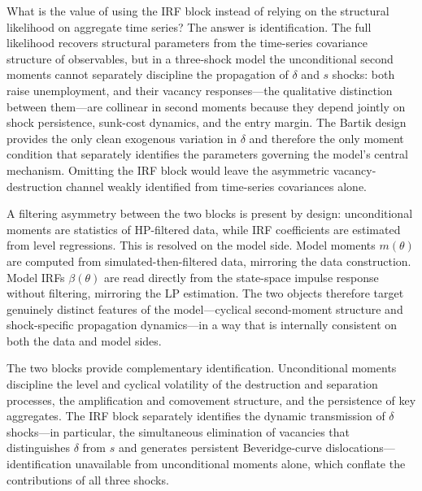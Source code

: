 \documentclass[authoryear, review, 12pt]{elsarticle}
\begin{document}
	What is the value of using the IRF block instead of relying on the structural likelihood on aggregate time series? The answer is identification.  The full likelihood recovers structural
	parameters from the time-series covariance structure of observables, but in a
	three-shock model the unconditional second moments cannot separately discipline the
	propagation of $\delta$ and $s$ shocks: both raise unemployment, and their
	vacancy responses---the qualitative distinction between them---are collinear in
	second moments because they depend jointly on shock persistence, sunk-cost
	dynamics, and the entry margin.  The Bartik design provides the only clean
	exogenous variation in $\delta$ and therefore the only moment condition that
	separately identifies the parameters governing the model's central mechanism.
	Omitting the IRF block would leave the asymmetric vacancy-destruction channel
	weakly identified from time-series covariances alone.

	A filtering asymmetry between the two blocks is present by design: unconditional
	moments are statistics of HP-filtered data, while IRF coefficients are estimated
	from level regressions. This is resolved on the model side. Model moments
	$m(\theta)$ are computed from simulated-then-filtered data, mirroring the data
	construction. Model IRFs $\beta(\theta)$ are read directly from the state-space
	impulse response without filtering, mirroring the LP estimation. The two objects
	therefore target genuinely distinct features of the model---cyclical second-moment
	structure and shock-specific propagation dynamics---in a way that is internally
	consistent on both the data and model sides.

	The two blocks provide complementary identification. Unconditional moments
	discipline the level and cyclical volatility of the destruction and separation
	processes, the amplification and comovement structure, and the persistence of key
	aggregates. The IRF block separately identifies the dynamic transmission of
	$\delta$ shocks---in particular, the simultaneous elimination of vacancies that
	distinguishes $\delta$ from $s$ and generates persistent Beveridge-curve
	dislocations---identification unavailable from unconditional moments alone, which
	conflate the contributions of all three shocks.
\end{document}
